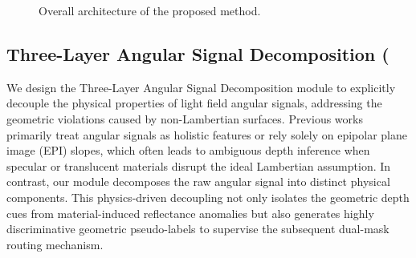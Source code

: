 \documentclass[lettersize,journal]{IEEEtran}
\begin{document}
\begin{figure}[!t]
\caption{Overall architecture of the proposed method.}
\label{fig:architecture}
\end{figure}

\subsection{Three-Layer Angular Signal Decomposition (}

We design the Three-Layer Angular Signal Decomposition module to explicitly decouple the physical properties of light field angular signals, addressing the geometric violations caused by non-Lambertian surfaces. Previous works  primarily treat angular signals as holistic features or rely solely on epipolar plane image (EPI) slopes, which often leads to ambiguous depth inference when specular or translucent materials disrupt the ideal Lambertian assumption. In contrast, our module decomposes the raw angular signal into distinct physical components. This physics-driven decoupling not only isolates the geometric depth cues from material-induced reflectance anomalies but also generates highly discriminative geometric pseudo-labels to supervise the subsequent dual-mask routing mechanism.
\end{document}
